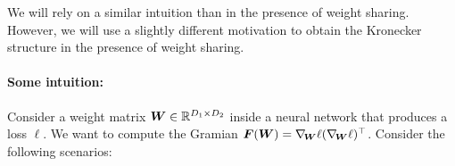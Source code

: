 
We will rely on a similar intuition than \citet{eschenhagen2023kroneckerfactored} in the presence of weight sharing.
However, we will use a slightly different motivation to obtain the Kronecker structure in the presence of weight sharing.

\paragraph{Some intuition:} Consider a weight matrix ${\bm{W}} \in {\mathbb{R}}^{D_1 \times
  D_2}$ inside a neural network that produces a loss $\ell$. We want to compute
the Gramian ${\bm{F}}({\bm{W}}) = \nabla_{\!{{\bm{W}}}}\ell (\nabla_{\!{{\bm{W}}}}\ell)^{\top}$. Consider the following scenarios:
